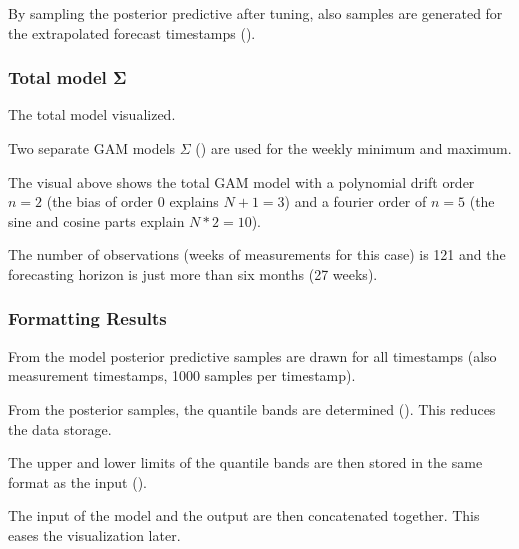 \documentclass[letterpaper,10pt,english]{sphinxmanual}
\let\sphinxpxdimen\pdfpxdimen\else\newdimen\sphinxpxdimen
\begin{document}
By sampling the posterior predictive after tuning, also samples are generated for the extrapolated forecast timestamps ({\hyperref[\detokenize{autoapi/src/forecast/forecast/index:src.forecast.forecast.determine_estimates}]{}}).


\subsubsection{Total model Σ}
\label{\detokenize{modeling:total-model}}\begin{quote}

\noindent{\hspace*{\fill}\sphinxincludegraphics[width=600\sphinxpxdimen]{{graph_model}.png}\hspace*{\fill}}
\end{quote}

The total model visualized.

Two separate GAM models \(\Sigma\) ({\hyperref[\detokenize{autoapi/src/model/model/index:src.model.model.create_model}]{}}) are used for the weekly minimum and maximum.

The visual above shows the total GAM model with a polynomial drift order \(n=2\) (the bias of order 0 explains \(N+1=3\)) and a fourier order of \(n=5\) (the sine and cosine parts explain \(N*2=10\)).

The number of observations (weeks of measurements for this case) is 121 and the forecasting horizon is just more than six months (27 weeks).


\subsubsection{Formatting Results}
\label{\detokenize{modeling:formatting-results}}
From the model posterior predictive samples are drawn for all timestamps (also measurement timestamps, 1000 samples per timestamp).

From the posterior samples, the quantile bands are determined ().
This reduces the data storage.

The upper and lower limits of the quantile bands are then stored in the same format as the input ().

The input of the model and the output are then concatenated together.
This eases the visualization later.
\begin{quote}

\noindent{\hspace*{\fill}\sphinxincludegraphics[width=800\sphinxpxdimen]{{data_stored}.png}\hspace*{\fill}}
\end{quote}
\end{document}
